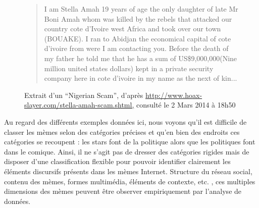 \begin{description}
\begin{figure}[htpb]
    \begin{quote}
        I am Stella Amah 19 years of age the only daughter of late Mr Boni Amah whom was killed by the rebels that attacked our country cote d'Ivoire west Africa and took over our town (BOUAKE). I ran to Abidjan the economical capital of cote d'ivoire from were I am contacting you. Before the death of my father he told me that he has a sum of US\$9,000,000(Nine million united states dollars) kept in a private security company here in cote d'ivoire in my name as the next of kin... 
    \end{quote}
    \caption[Extrait d'un spam du type \textit{Nigerian Scam}]{
        Extrait d{\textquoteright}un {\textquotedblleft}Nigerian Scam{\textquotedblright}, d{\textquoteright}après \url{http://www.hoax-slayer.com/stella-amah-scam.shtml,} consulté le 2 Mars 2014 à 18h50
    }
    \label{fig:nigerian-scam}
\end{figure}

\end{description}

Au regard des différents exemples données ici, nous voyons qu{\textquoteright}il est difficile de classer les mèmes selon des catégories précises et qu{\textquoteright}en bien des endroits ces catégories se recoupent : les stars font de la politique alors que les politiques font dans le comique. Ainsi, il ne s{\textquoteright}agit pas de dresser des catégories rigides mais de disposer d{\textquoteright}une classification flexible pour pouvoir identifier clairement les éléments discursifs présents dans les mèmes Internet. Structure du réseau social, contenu des mèmes, formes multimédia, éléments de contexte, etc. , ces multiples dimensions des mèmes peuvent être observer empiriquement par l{\textquoteright}analyse de données.